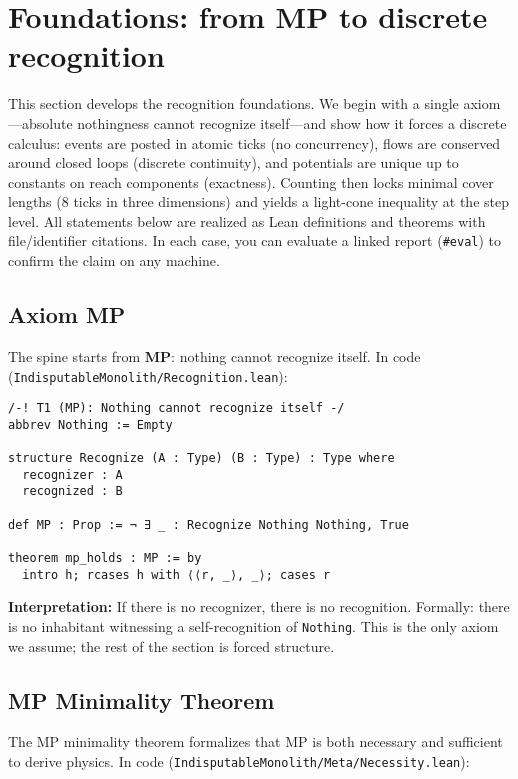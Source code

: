 \documentclass[11pt,a4paper,twoside]{article}
\numberwithin{equation}{section}
\theoremstyle{customthm}
\theoremstyle{customdef}
\theoremstyle{customrem}
\begin{document}
\section{Foundations: from MP to discrete recognition}\label{sec:foundations}

This section develops the recognition foundations. We begin with a single axiom—absolute nothingness cannot recognize itself—and show how it forces a discrete calculus: events are posted in atomic ticks (no concurrency), flows are conserved around closed loops (discrete continuity), and potentials are unique up to constants on reach components (exactness). Counting then locks minimal cover lengths (8 ticks in three dimensions) and yields a light-cone inequality at the step level. All statements below are realized as Lean definitions and theorems with file/identifier citations. In each case, you can evaluate a linked report (\texttt{\#eval}) to confirm the claim on any machine.

\subsection{Axiom MP}

\noindent The spine starts from \textbf{MP}: nothing cannot recognize itself. In code (\texttt{IndisputableMonolith/Recognition.lean}):

\begin{lstlisting}
/-! T1 (MP): Nothing cannot recognize itself -/
abbrev Nothing := Empty

structure Recognize (A : Type) (B : Type) : Type where
  recognizer : A
  recognized : B

def MP : Prop := ¬ ∃ _ : Recognize Nothing Nothing, True

theorem mp_holds : MP := by
  intro h; rcases h with ⟨⟨r, _⟩, _⟩; cases r
\end{lstlisting}

\noindent\textbf{Interpretation:} If there is no recognizer, there is no recognition. Formally: there is no inhabitant witnessing a self-recognition of \texttt{Nothing}. This is the only axiom we assume; the rest of the section is forced structure.

\subsection{MP Minimality Theorem}

The MP minimality theorem formalizes that MP is both necessary and sufficient to derive physics. In code (\texttt{IndisputableMonolith/Meta/Necessity.lean}):
\end{document}
